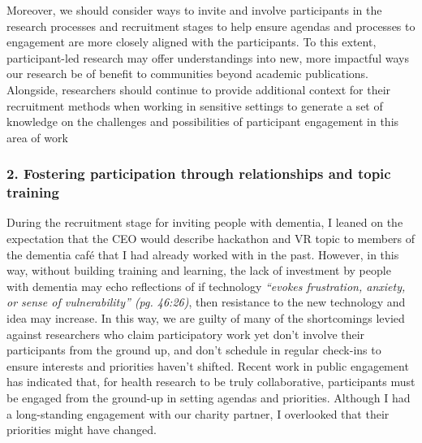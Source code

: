 Moreover, we should consider ways to invite and involve participants in the research processes and recruitment stages to help ensure agendas and processes to engagement are more closely aligned with the participants. To this extent, participant-led research may offer understandings into new, more impactful ways our research be of benefit to communities beyond academic publications. Alongside, researchers should continue to provide additional context for their recruitment methods when working in sensitive settings to generate a set of knowledge on the challenges and possibilities of participant engagement in this area of work


\subsubsection{2. Fostering participation through relationships and topic training}
\label{TopicTraining}
During the recruitment stage for inviting people with dementia, I leaned on the expectation that the CEO would describe hackathon and VR topic to members of the dementia café that I had already worked with in the past. However, in this way, without building training and learning, the lack of investment by people with dementia may echo \cite{hwang2020exploring} reflections of if technology \textit{“evokes frustration, anxiety, or sense of vulnerability” (pg. 46:26)}, then resistance to the new technology and idea may increase. In this way, we are guilty of many of the shortcomings levied against researchers who claim participatory work yet don’t involve their participants from the ground up, and don’t schedule in regular check-ins to ensure interests and priorities haven’t shifted. Recent work in public engagement has indicated that, for health research to be truly collaborative, participants must be engaged from the ground-up in setting agendas and priorities. Although I had a long-standing engagement with our charity partner, I overlooked that their priorities might have changed.

